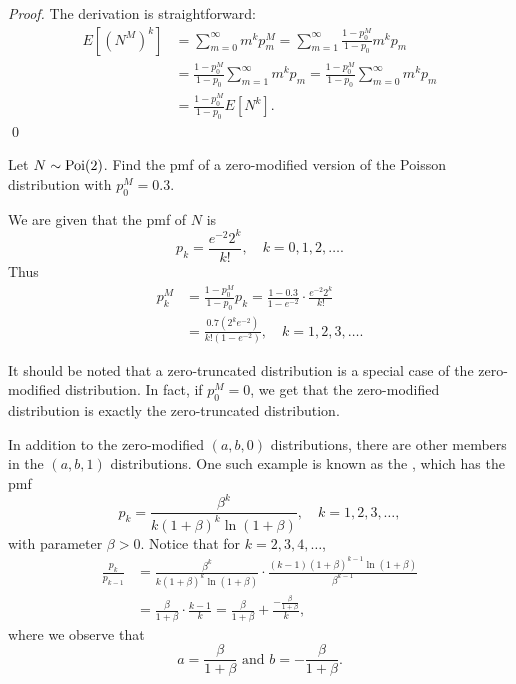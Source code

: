 \documentclass[notoc,notitlepage]{tufte-book}
\begin{document}
\begin{proof}
  The derivation is straightforward:
  \begin{align*}
    E \left[ \left( N^M \right)^k \right] &= \sum_{m = 0}^{\infty} m^k p_m^M = \sum_{m=1}^{\infty} \frac{1 - p_0^M}{1 - p_0} m^k p_m \\
                                          &= \frac{1 - p_0^M}{1 - p_0} \sum_{m=1}^{\infty} m^k p_m = \frac{1 - p_0^M}{1 - p_0} \sum_{m = 0}^{\infty} m^k p_m \\
                                          &= \frac{1 - p_0^M}{1 - p_0} E \left[ N^k \right].
  \end{align*}\qed\
\end{proof}

\begin{eg}
  Let $N \sim \operatorname{Poi}(2)$. Find the pmf of a zero-modified version of the Poisson distribution with $p_0^M = 0.3$.
\end{eg}

\begin{solution}
  We are given that the pmf of $N$ is
  \begin{equation*}
    p_k = \frac{e^{-2} 2^k}{k!}, \quad k = 0, 1, 2, \ldots .
  \end{equation*}
  Thus
  \begin{align*}
    p_k^M &= \frac{1 - p_0^M}{1 - p_0} p_k = \frac{1 - 0.3}{1 - e^{-2}} \cdot \frac{e^{-2} 2^k}{k!} \\
          &= \frac{0.7 \left( 2^k e^{-2} \right)}{k! (1 - e^{-2})}, \quad k = 1, 2, 3, \ldots.
  \end{align*}
\end{solution}

\begin{note}
  It should be noted that a zero-truncated distribution is a special case of the zero-modified distribution. In fact, if $p_0^M = 0$, we get that the zero-modified distribution is exactly the zero-truncated distribution.
\end{note}

In addition to the zero-modified $(a, b, 0)$ distributions, there are other members in the $(a, b, 1)$ distributions. One such example is known as the , which has the pmf
\begin{equation*}
  p_k = \frac{\beta^k}{k ( 1 + \beta )^k \ln ( 1 + \beta )} , \quad k = 1, 2, 3, \ldots,
\end{equation*}
with parameter $\beta > 0$. Notice that for $k = 2, 3, 4, \ldots$,
\begin{align*}
  \frac{p_k}{p_{k - 1}} &= \frac{\beta^k}{k ( 1 + \beta )^k \ln (1 + \beta)} \cdot \frac{(k - 1) ( 1 + \beta )^{k - 1} \ln ( 1 + \beta )}{\beta^{k - 1}} \\
                        &= \frac{\beta}{1 + \beta} \cdot \frac{k - 1}{k} = \frac{\beta}{1 + \beta} + \frac{- \frac{\beta}{1 + \beta}}{k},
\end{align*}
where we observe that
\begin{equation*}
  a = \frac{\beta}{1 + \beta} \text{ and } b = - \frac{\beta}{1 + \beta}.
\end{equation*}
\end{document}
